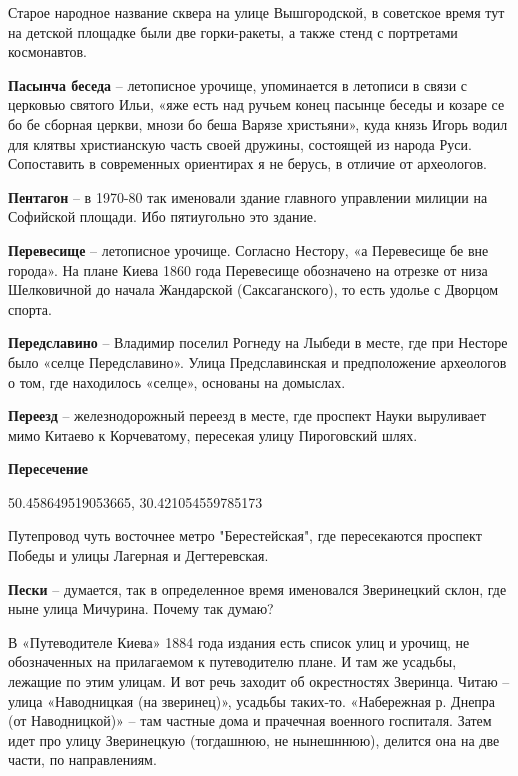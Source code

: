 Старое народное название сквера на улице Вышгородской, в советское время тут на детской площадке были две горки-ракеты, а также стенд с портретами космонавтов.\\

\medskip

\textbf{Пасынча беседа} – летописное урочище, уп\-оминается в летописи в связи с церковью святого Ильи, «яже есть над ручьем конец пасынце беседы и козаре се бо бе сборная церкви, мнози бо беша Варязе христьяни», куда князь Игорь водил для клятвы христианскую часть своей дружины, состоящей из народа Руси. Сопоставить в современных ориентирах я не берусь, в отличие от археологов.\\

\medskip

\textbf{Пентагон} – в 1970-80 так именовали здание главного управлении милиции на Софийской площади. Ибо пятиугольно это здание.\\

\medskip

\textbf{Перевесище} – летописное урочище. Согласно Нестору, «а Перевесище бе вне города». На плане Киева 1860 года Перевесище обозначено на отрезке от низа Шелковичной до начала Жандарской (Саксаганского), то есть удолье с Дворцом спорта.\\

\medskip

\textbf{Передславино} – Владимир поселил Рогнеду на Лыбеди в месте, где при Несторе было «селце Передславино». Улица Предславинская и предположение археологов о том, где находилось «селце», основаны на домыслах.\\

\medskip

\textbf{Переезд} – железнодорожный переезд в месте, где проспект Науки выруливает мимо Китаево к Корчеватому, пересекая улицу Пироговский шлях.\\

\medskip

\textbf{Пересечение}

50.458649519053665, 30.421054559785173

Путепровод  чуть восточнее метро "Берестейская", где пересекаются проспект Победы и улицы Лагерная и Дегтеревская.

\medskip

\textbf{Пески}  – думается, так в определенное время именовался Зверинецкий склон, где ныне улица Мичурина. Почему так думаю?

В «Путеводителе Киева» 1884 года издания есть список улиц и урочищ, не обозначенных на прилагаемом к путеводителю плане. И там же усадьбы, лежащие по этим улицам. И вот речь заходит об окрестностях Зверинца. Читаю – улица «Наводницкая (на зверинец)», усадьбы таких-то. «Набережная р. Днепра (от Наводницкой)» – там частные дома и прачечная военного госпиталя. Затем идет про улицу Зверинецкую (тогдашнюю, не нынешннюю), делится она на две части, по направлениям.

